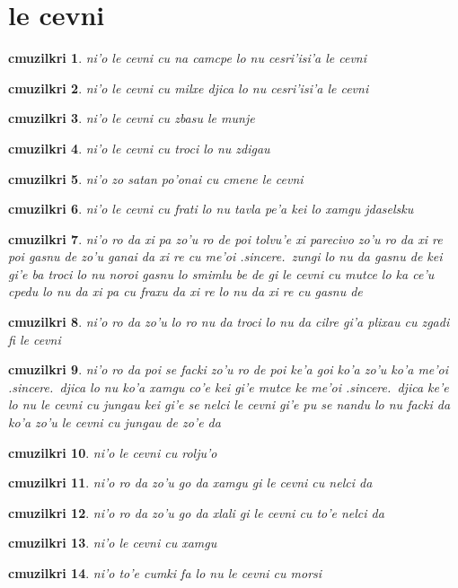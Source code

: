\documentclass{report}
\newtheorem{cmuzilkri}{cmuzilkri}
\begin{document}
\section{le cevni}
\begin{cmuzilkri}
	ni'o le cevni cu na camcpe lo nu cesri'isi'a le cevni
\end{cmuzilkri}
\begin{cmuzilkri}
	ni'o le cevni cu milxe djica lo nu cesri'isi'a le cevni
\end{cmuzilkri}
\begin{cmuzilkri}
	ni'o le cevni cu zbasu le munje
\end{cmuzilkri}
\begin{cmuzilkri}
	ni'o le cevni cu troci lo nu zdigau
\end{cmuzilkri}
\begin{cmuzilkri}
	ni'o zo satan po'onai cu cmene le cevni
\end{cmuzilkri}
\begin{cmuzilkri}
	ni'o le cevni cu frati lo nu tavla pe'a kei lo xamgu jdaselsku
\end{cmuzilkri}
\begin{cmuzilkri}
	ni'o ro da xi pa zo'u ro de poi tolvu'e xi parecivo zo'u ro da xi re poi gasnu de zo'u ganai da xi re cu me'oi .sincere.\ zungi lo nu da gasnu de kei gi'e ba troci lo nu noroi gasnu lo smimlu be de gi le cevni cu mutce lo ka ce'u cpedu lo nu da xi pa cu fraxu da xi re lo nu da xi re cu gasnu de
\end{cmuzilkri}
\begin{cmuzilkri}
	ni'o ro da zo'u lo ro nu da troci lo nu da cilre gi'a plixau cu zgadi fi le cevni
\end{cmuzilkri}
\begin{cmuzilkri}
	ni'o ro da poi se facki zo'u ro de poi ke'a goi ko'a zo'u ko'a me'oi .sincere.\ djica lo nu ko'a xamgu co'e kei gi'e mutce ke me'oi .sincere.\ djica ke'e lo nu le cevni cu jungau kei gi'e se nelci le cevni gi'e pu se nandu lo nu facki da ko'a zo'u le cevni cu jungau de zo'e da
\end{cmuzilkri}
\begin{cmuzilkri}
	ni'o le cevni cu rolju'o
\end{cmuzilkri}
\begin{cmuzilkri}
	ni'o ro da zo'u go da xamgu gi le cevni cu nelci da
\end{cmuzilkri}
\begin{cmuzilkri}
	ni'o ro da zo'u go da xlali gi le cevni cu to'e nelci da
\end{cmuzilkri}
\begin{cmuzilkri}
	ni'o le cevni cu xamgu
\end{cmuzilkri}
\begin{cmuzilkri}
	ni'o to'e cumki fa lo nu le cevni cu morsi
\end{cmuzilkri}
\end{document}
